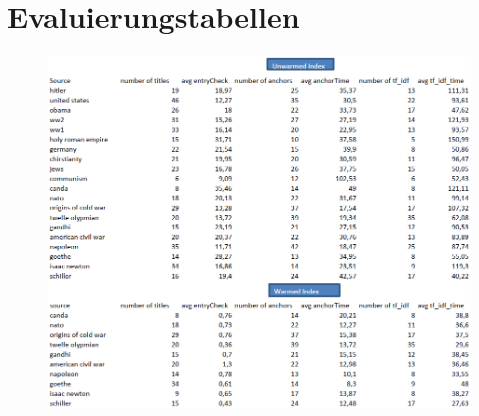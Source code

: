 \documentclass[11pt, a4paper, oneside]{Thesis} %
\begin{document}


\appendix %
\chapter{Evaluierungstabellen}

\begin{figure}[!ht]

\includegraphics[scale=0.65,angle=270]{eval.png}
\end{figure}






\backmatter


\label{Quellen}
\end{document}
